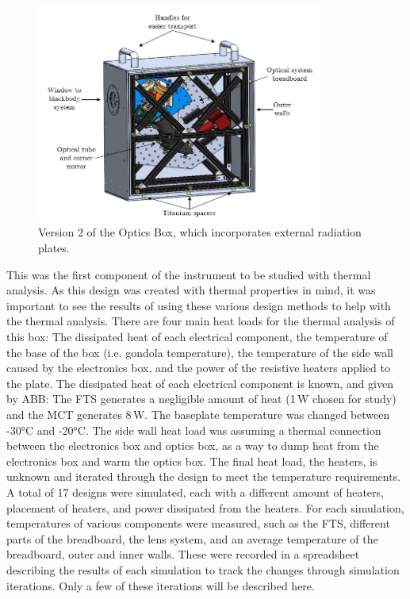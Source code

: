 \begin{figure}
    \centering
    \includegraphics[width=0.84\textwidth]{chap3_images/LIFE_V2_images/Optics_Box_V1_labelled.JPG}
    \caption{Version 2 of the Optics Box, which incorporates external radiation plates.}
    \label{fig:OB_V2}
\end{figure}

This was the first component of the instrument to be studied with thermal analysis. As this design was created with thermal properties in mind, it was important to see the results of using these various design methods to help with the thermal analysis. There are four main heat loads for the thermal analysis of this box: The dissipated heat of each electrical component, the temperature of the base of the box (i.e. gondola temperature), the temperature of the side wall caused by the electronics box, and the power of the resistive heaters applied to the plate. The dissipated heat of each electrical component is known, and given by ABB: The FTS generates a negligible amount of heat (1\,W chosen for study) and the MCT generates 8\,W. The baseplate temperature was changed between -30°C and -20°C. The side wall heat load was assuming a thermal connection between the electronics box and optics box, as a way to dump heat from the electronics box and warm the optics box. The final heat load, the heaters, is unknown and iterated through the design to meet the temperature requirements. A total of 17 designs were simulated, each with a different amount of heaters, placement of heaters, and power dissipated from the heaters. For each simulation, temperatures of various components were measured, such as the FTS, different parts of the breadboard, the lens system, and an average temperature of the breadboard, outer and inner walls. These were recorded in a spreadsheet describing the results of each simulation to track the changes through simulation iterations. Only a few of these iterations will be described here.

